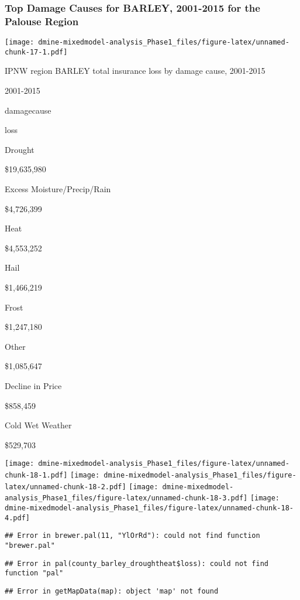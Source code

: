\documentclass[]{article}
\begin{document}
\subsubsection{Top Damage Causes for BARLEY, 2001-2015 for the Palouse
Region}\label{top-damage-causes-for-barley-2001-2015-for-the-palouse-region}

\texttt{[image: dmine-mixedmodel-analysis\_Phase1\_files/figure-latex/unnamed-chunk-17-1.pdf]}

IPNW region BARLEY total insurance loss by damage cause, 2001-2015

2001-2015

damagecause

loss

Drought

\$19,635,980

Excess Moisture/Precip/Rain

\$4,726,399

Heat

\$4,553,252

Hail

\$1,466,219

Frost

\$1,247,180

Other

\$1,085,647

Decline in Price

\$858,459

Cold Wet Weather

\$529,703

\texttt{[image: dmine-mixedmodel-analysis\_Phase1\_files/figure-latex/unnamed-chunk-18-1.pdf]}
\texttt{[image: dmine-mixedmodel-analysis\_Phase1\_files/figure-latex/unnamed-chunk-18-2.pdf]}
\texttt{[image: dmine-mixedmodel-analysis\_Phase1\_files/figure-latex/unnamed-chunk-18-3.pdf]}
\texttt{[image: dmine-mixedmodel-analysis\_Phase1\_files/figure-latex/unnamed-chunk-18-4.pdf]}

\begin{verbatim}
## Error in brewer.pal(11, "YlOrRd"): could not find function "brewer.pal"
\end{verbatim}

\begin{verbatim}
## Error in pal(county_barley_droughtheat$loss): could not find function "pal"
\end{verbatim}

\begin{verbatim}
## Error in getMapData(map): object 'map' not found
\end{verbatim}
\end{document}
